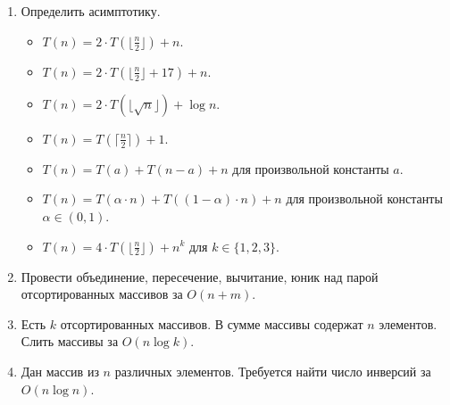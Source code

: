 \section{}

\begin{enumerate}

  \item Определить асимптотику.
    \begin{itemize}
      \item $T(n) = 2 \cdot T(\lfloor \frac{n}{2} \rfloor) + n$.
      \item $T(n) = 2 \cdot T(\lfloor \frac{n}{2} \rfloor + 17) + n$.
      \item $T(n) = 2 \cdot T(\lfloor \sqrt{n} \rfloor) + \log n$.
      \item $T(n) = T(\lceil \frac{n}{2} \rceil) + 1$.
      \item $T(n) = T(a) + T(n - a) + n$ для произвольной константы $a$.
      \item $T(n) = T(\alpha \cdot n) + T((1 - \alpha) \cdot n) + n$ для произвольной
                константы $\alpha \in (0, 1)$.
      \item $T(n) = 4 \cdot T(\lfloor \frac{n}{2} \rfloor) + n^k$ для $k \in \{1, 2, 3\}$.
    \end{itemize}

  \item Провести объединение, пересечение, вычитание, юник над парой отсортированных
     массивов за $O(n + m)$.

  \item Есть $k$ отсортированных массивов. В сумме массивы содержат $n$ элементов.
        Слить массивы за $O(n \log k)$.

  \item Дан массив из $n$ различных элементов. Требуется найти число инверсий за $O(n \log n)$.

\end{enumerate}
